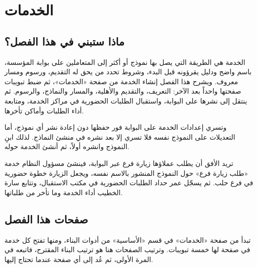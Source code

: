 \chapter{الخدمات}
\label{ch:builder-services}

\section{ماذا ستبني في هذا الفصل؟}
\label{sec:builder-services-intro}

الخدمة هي الطريقة التي يصل بها نموذج أو أكثر إلى المتعاملين على بوابة المؤسسة، باسم واضح ودليل يقرؤونه قبل البدء، وشروط تحدد من يحق له التقديم، ورسوم ومسار معروف. ويشرح هذا الفصل إنشاء الخدمة من صفحة «الخدمات»، ثم ضبط تبويبات صفحتها واحداً بعد الآخر: التعريف، والتقديم والأهلية، والمسار والنماذج، والرسوم. ثم ينتقل إلى نشرها على البوابة، واستقبال الطلبات الحضورية في مراكز الخدمة، ومتابعة أداء الطلبات وأماكن تأخرها.

وتسري إعدادات الخدمة على البوابة فور حفظها دون إعادة نشر أي نموذج، أما التعديلات على النموذج نفسه فلا تسري إلا بعد نشره في منشئ النماذج. لذلك ابنِ النموذج وانشره أولاً، ثم أنشئ الخدمة حوله.

\begin{rcnote}
تريد الأفق أن يطلب عملاؤها زيارة فرع عبر البوابة، فينشئ مسؤول النظام خدمة «طلب زيارة فرع» حول النموذج المنشور بالاسم نفسه، ويجعل الزيارة خطوة حضورية في فرع حلب. ثم يسجّل عمر حداد الطلبات الحضورية في مكتب الاستقبال، وتتابع سارة الخطيب أداء الخدمة وما تأخر من طلباتها.
\end{rcnote}

\section{صفحات هذا الفصل}
\label{sec:builder-services-pages}

تبدأ من صفحة «الخدمات» في قسم «الأساسية» من أدوات البناء، ومنها تفتح كل خدمة في صفحة لها خمسة تبويبات. وترتيب الصفحات هنا هو ترتيب البناء المقترح، فاتبعه في المرة الأولى، ثم عُد إلى أي صفحة عندما تحتاج إليها.

